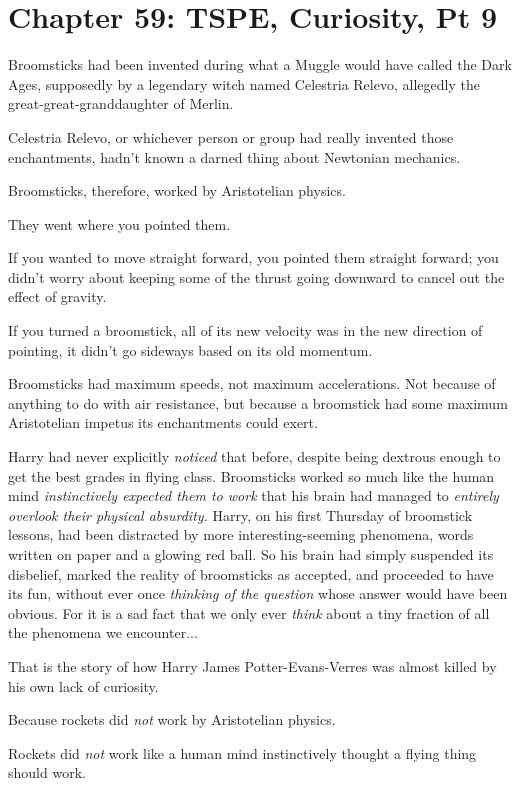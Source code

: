 \chapter{Chapter 59: TSPE, Curiosity, Pt 9}
Broomsticks had been invented during what a Muggle would have called the
Dark Ages, supposedly by a legendary witch named Celestria Relevo,
allegedly the great-great-granddaughter of Merlin.

Celestria Relevo, or whichever person or group had really invented those
enchantments, hadn't known a darned thing about Newtonian mechanics.

Broomsticks, therefore, worked by Aristotelian physics.

They went where you pointed them.

If you wanted to move straight forward, you pointed them straight
forward; you didn't worry about keeping some of the thrust going
downward to cancel out the effect of gravity.

If you turned a broomstick, all of its new velocity was in the new
direction of pointing, it didn't go sideways based on its old momentum.

Broomsticks had maximum speeds, not maximum accelerations. Not because
of anything to do with air resistance, but because a broomstick had some
maximum Aristotelian impetus its enchantments could exert.

Harry had never explicitly \emph{noticed} that before, despite being
dextrous enough to get the best grades in flying class. Broomsticks
worked so much like the human mind \emph{instinctively expected them to
work} that his brain had managed to \emph{entirely overlook their
physical absurdity.} Harry, on his first Thursday of broomstick lessons,
had been distracted by more interesting-seeming phenomena, words written
on paper and a glowing red ball. So his brain had simply suspended its
disbelief, marked the reality of broomsticks as accepted, and proceeded
to have its fun, without ever once \emph{thinking of the question} whose
answer would have been obvious. For it is a sad fact that we only ever
\emph{think} about a tiny fraction of all the phenomena we
encounter...

That is the story of how Harry James Potter-Evans-Verres was almost
killed by his own lack of curiosity.

Because rockets did \emph{not} work by Aristotelian physics.

Rockets did \emph{not} work like a human mind instinctively thought a
flying thing should work.

